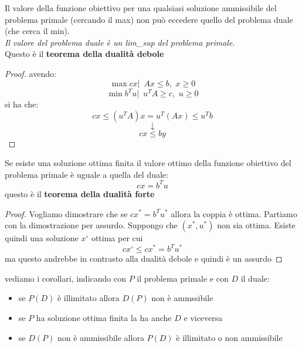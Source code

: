 \documentclass[a4paper,12pt, oneside]{book}
\begin{document}
\begin{teorema}
  Il valore della funzione obiettivo per una qualsiasi soluzione
  ammissibile del problema primale (cercando il max) non può eccedere
  quello del problema duale (che cerca il min).\\
  \textit{Il valore del problema duale è un \textit{lim\_sup} del
    problema primale}.\\
  Questo è il \textbf{teorema della dualità debole}
\end{teorema}
\begin{proof}
  avendo:
  \[\max cx|\,\,\, Ax\leq b,\,\,x\geq 0\]
  \[\min b^Tu|\,\,\,u^TA\geq c,\,\,u\geq 0\]
  si ha che:
  \[cx\leq (u^TA)x=u^T(Ax)\leq u^Tb\]
  \[\downarrow\]
  \[cx\leq by\]
\end{proof}
\begin{teorema}
  Se esiste una soluzione ottima finita il valore ottimo della
  funzione obiettivo del problema primale è uguale a quella del duale:
  \[cx=b^Tu\]
  questo è il \textbf{teorema della dualità forte}
\end{teorema}
\begin{proof}
  Vogliamo dimostrare che se $cx^*=b^Tu^*$ allora la coppia è
  ottima. Partiamo con la dimostrazione per assurdo. Suppongo che
  $(x^*,u^*)$ non sia ottima. Esiste quindi una soluzione $x^\circ$
  ottima per cui
  \[cx^\circ \leq cx^*=b^Tu^*\]
  ma questo andrebbe in contrasto alla dualità debole e quindi è un
  assurdo
\end{proof}
vediamo i corollari, indicando con $P$ il problema primale e con $D$
il duale:
\begin{itemize}
  \item se $P(D)$ è illimitato allora $D(P)$ non è ammssibile
  \item se $P$ ha soluzione ottima finita la ha anche $D$ e viceversa
  \item se $D(P)$ non è ammissibile allora $P(D)$ è illimitato o non
  ammissibile 
\end{itemize}
\end{document}

